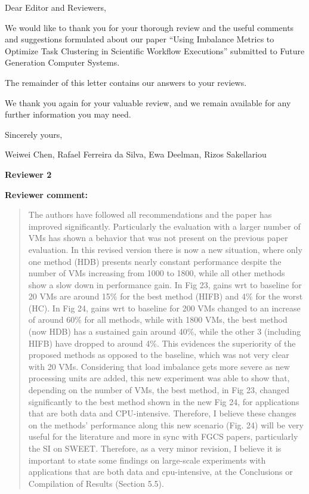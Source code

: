 \documentclass{letter}
\date{Sep 1, 2014}
\newenvironment{review}%
{\textbf{Reviewer comment:}\begin{quote}}%
{\end{quote}}%
\begin{document}
\begin{letter}{}

\opening{Dear Editor and Reviewers,}

We would like to thank you for your thorough review and the useful
comments and suggestions formulated about our paper ``Using Imbalance Metrics to Optimize Task Clustering in Scientific Workflow Executions'' submitted to
Future Generation Computer Systems.

The remainder of this letter contains our answers to your reviews. 

We thank you again for your valuable review, and we remain available for any further information you may need.

\vspace{0.5cm}

Sincerely yours,

\vspace{1cm}

Weiwei Chen, Rafael Ferreira da Silva, Ewa Deelman, Rizos Sakellariou

\newpage

\textbf{Reviewer 2}


\begin{review}
The authors have followed all recommendations and the paper has improved significantly. Particularly the evaluation with a larger number of VMs has shown a behavior that was not present on the previous paper evaluation. In this revised version there is now a new situation, where only one method (HDB) presents nearly constant performance despite the number of VMs increasing from 1000 to 1800, while all other methods show a slow down in performance gain. In Fig 23, gains wrt to baseline for 20 VMs are around 15\% for the best method (HIFB) and 4\% for the worst (HC). In Fig 24, gains wrt to baseline for 200 VMs changed to an increase of around 60\% for all methods, while with 1800 VMs, the best method (now HDB) has a sustained gain around 40\%, while the other 3 (including HIFB) have dropped to around 4\%. This evidences the superiority of the proposed methods as opposed to the baseline, which was not very clear with 20 VMs. Considering that load imbalance gets more
severe as new processing units are added, this new experiment was able to show that, depending on the number of VMs, the best method, in Fig 23, changed significantly to the best method shown in the new Fig 24, for applications that are both data and CPU-intensive. Therefore, I believe these changes on the methods' performance along this new scenario (Fig. 24) will be very useful for the literature and more in sync with FGCS papers, particularly the SI on SWEET.
Therefore, as a very minor revision, I believe it is important to state some findings on large-scale experiments with applications that are both data and cpu-intensive, at the Conclusions or Compilation of Results (Section 5.5).\end{review}


\end{letter}
\end{document}
